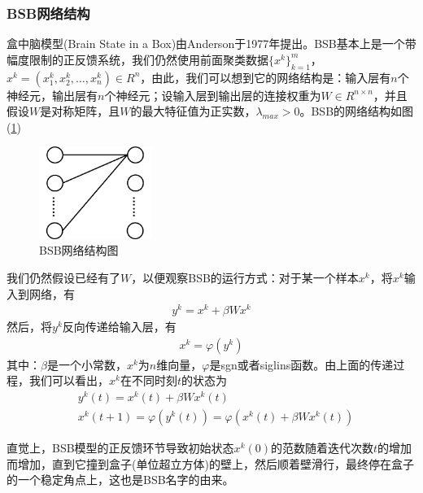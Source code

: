 {        \subsubsection{BSB网络结构}
            \par
            盒中脑模型(Brain State in a Box)由Anderson于1977年提出。BSB基本上是一个带幅度限制的正反馈系统，我们仍然使用前面聚类数据$\{x^k\}_{k=1}^m$，$x^k = (x_1^k,x_2^k,\dots,x_n^k)\in R^n$，由此，我们可以想到它的网络结构是：输入层有$n$个神经元，输出层有$n$个神经元；设输入层到输出层的连接权重为$W\in R^{n\times n}$，并且假设$W$是对称矩阵，且$W$的最大特征值为正实数，$\lambda_{max}>0$。BSB的网络结构如图(\ref{fig:BSB的网络结构图})
            \begin{figure}[H]
            \centering
            \includegraphics[height=3cm]{images/BSB_network_structure.jpg}
            \caption{BSB网络结构图}
            \label{fig:BSB的网络结构图}
            \end{figure}
            我们仍然假设已经有了$W$，以便观察BSB的运行方式：对于某一个样本$x^k$，将$x^k$输入到网络，有
            \begin{align*}
            y^k = x^k+\beta W x^k
            \end{align*}
            然后，将$y^k$反向传递给输入层，有
            \begin{align*}
            x^k = \varphi(y^k)
            \end{align*}
            其中：$\beta$是一个小常数，$x^k$为$n$维向量，$\varphi$是sgn或者siglins函数。由上面的传递过程，我们可以看出，$x^k$在不同时刻$t$的状态为
            \begin{align*}
            & y^k(t) = x^k(t)+\beta W x^k(t)\\
            & x^k(t+1) = \varphi(y^k(t)) = \varphi(x^k(t)+\beta Wx^k(t))
            \end{align*}
            \par
            直觉上，BSB模型的正反馈环节导致初始状态$x^k(0)$的范数随着迭代次数$t$的增加而增加，直到它撞到盒子(单位超立方体)的壁上，然后顺着壁滑行，最终停在盒子的一个稳定角点上，这也是BSB名字的由来。
}
